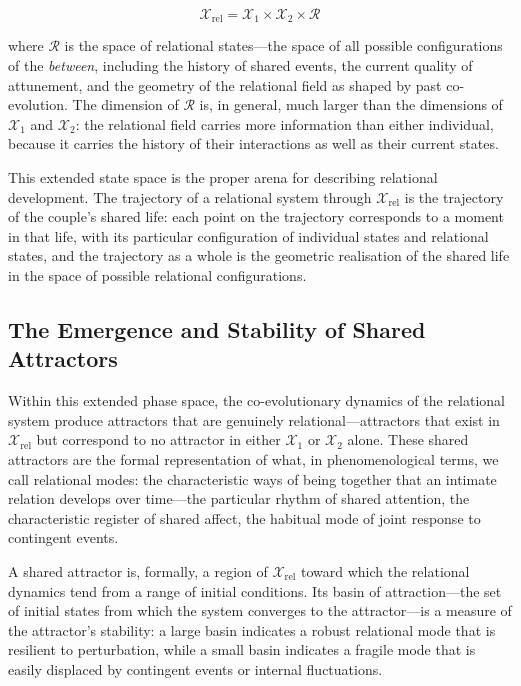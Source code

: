 \begin{equation}
\mathcal{X}_{\mathrm{rel}} = \mathcal{X}_1 \times \mathcal{X}_2 \times \mathcal{R}
\end{equation}

where $\mathcal{R}$ is the space of relational states---the space of all possible configurations of the \emph{between}, including the history of shared events, the current quality of attunement, and the geometry of the relational field as shaped by past co-evolution. The dimension of $\mathcal{R}$ is, in general, much larger than the dimensions of $\mathcal{X}_1$ and $\mathcal{X}_2$: the relational field carries more information than either individual, because it carries the history of their interactions as well as their current states.

This extended state space is the proper arena for describing relational development. The trajectory of a relational system through $\mathcal{X}_{\mathrm{rel}}$ is the trajectory of the couple's shared life: each point on the trajectory corresponds to a moment in that life, with its particular configuration of individual states and relational states, and the trajectory as a whole is the geometric realisation of the shared life in the space of possible relational configurations.

\subsection{The Emergence and Stability of Shared Attractors}
\label{p14:subsec:attractors}

\noindent
Within this extended phase space, the co-evolutionary dynamics of the relational system produce attractors that are genuinely relational---attractors that exist in $\mathcal{X}_{\mathrm{rel}}$ but correspond to no attractor in either $\mathcal{X}_1$ or $\mathcal{X}_2$ alone. These shared attractors are the formal representation of what, in phenomenological terms, we call relational modes: the characteristic ways of being together that an intimate relation develops over time---the particular rhythm of shared attention, the characteristic register of shared affect, the habitual mode of joint response to contingent events.

A shared attractor is, formally, a region of $\mathcal{X}_{\mathrm{rel}}$ toward which the relational dynamics tend from a range of initial conditions. Its basin of attraction---the set of initial states from which the system converges to the attractor---is a measure of the attractor's stability: a large basin indicates a robust relational mode that is resilient to perturbation, while a small basin indicates a fragile mode that is easily displaced by contingent events or internal fluctuations.

